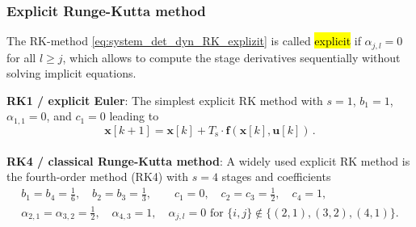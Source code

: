 \begin{frame}
    \frametitle{Explicit Runge-Kutta method}
    The RK-method \eqref{eq:system_det_dyn_RK_explizit} is called \hl{explicit} if $\alpha_{j,l}=0$ for all $l\geq j$, which allows to compute the stage derivatives sequentially without solving implicit equations.\\[1em]\pause

    \textbf{RK1 / explicit Euler}: The simplest explicit RK method  with $s=1$, $b_1=1$, $\alpha_{1,1}=0$, and $c_1=0$ leading to
    \begin{equation}
        \bm{x}[k+1] = \bm{x}[k] + T_\mathrm{s}\cdot \bm{f}\left(\bm{x}[k],\bm{u}[k]\right)\,.
        \label{eq:RK1}
    \end{equation}
    \\[1em]\pause
    \textbf{RK4 / classical Runge-Kutta method}: A widely used explicit RK method is the fourth-order method (RK4) with $s=4$ stages and coefficients
    \begin{equation}
        \begin{split}
            b_1           = b_4 = \frac{1}{6}, \quad b_2 = b_3 = \frac{1}{3},                                                                           \qquad
            c_1           = 0, \quad c_2 = c_3 = \frac{1}{2}, \quad c_4 = 1,                                                                             \\
            \alpha_{2,1}  = \alpha_{3,2} = \frac{1}{2}, \quad \alpha_{4,3} = 1, \quad \alpha_{j,l} = 0 \text{ for } \{i,j\}\notin \{(2,1),(3,2),(4,1)\}. \\
        \end{split}
        \label{eq:RK4_coeff}
    \end{equation}
\end{frame}

